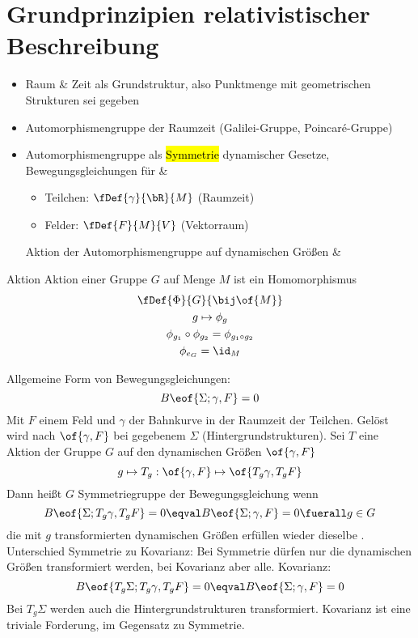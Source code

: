 \section{Grundprinzipien relativistischer Beschreibung}

\begin{itemize}
	\item Raum \& Zeit als Grundstruktur, also Punktmenge mit geometrischen Strukturen sei gegeben
	\item Automorphismengruppe der Raumzeit (\exmpl Galilei-Gruppe, Poincaré-Gruppe)
	\item Automorphismengruppe als \hl{Symmetrie} dynamischer Gesetze, Bewegungsgleichungen für  \&  
	\begin{itemize}
		\item Teilchen: \abb $\fDef{\gamma}{\bR}{M}$ (Raumzeit)
		\item Felder: \abb $\fDef{F}{M}{V}$ (Vektorraum)
	\end{itemize}
	Aktion der Automorphismengruppe  auf dynamischen Größen  \& 
\end{itemize}
\begin{definition}{Aktion}
	Aktion einer Gruppe $G$ auf Menge $M$ ist ein Homomorphismus 
	\begin{gather}
		\fDef{\Phi}{G}{\bij\of{M}} \\
		g \mapsto \phi_g \\
		\phi_{g_1} \circ \phi_{g_2} = \phi_{g_1 \circ g_2} \\
		\phi_{e_G} = \id_M
	\end{gather}
\end{definition}
Allgemeine Form von Bewegungsgleichungen:
\begin{equation}
	B\eof{\Sigma;\gamma,F} = 0
\end{equation}
Mit $F$ einem Feld und $\gamma$ der Bahnkurve in der Raumzeit der Teilchen. Gelöst wird nach $\of{\gamma,F}$ bei gegebenem $\Sigma$ (Hintergrundstrukturen). Sei $T$ eine Aktion der Gruppe $G$ auf den dynamischen Größen $\of{\gamma,F}$
\begin{equation}
	g \mapsto T_g : \of{\gamma,F} \mapsto \of{T_g \gamma, T_g F}
\end{equation}
Dann heißt $G$ Symmetriegruppe der Bewegungsgleichung \kla{\bwg} wenn
\begin{equation}
	B\eof{\Sigma;T_g \gamma, T_g F} = 0 \eqval B\eof{\Sigma; \gamma, F} = 0 \fuerall g \in G
\end{equation}
\dah die mit $g$ transformierten dynamischen Größen erfüllen wieder dieselbe \bwg.
\\
Unterschied Symmetrie zu Kovarianz: Bei Symmetrie dürfen nur die dynamischen Größen transformiert werden, bei Kovarianz aber alle. 
Kovarianz: 
\begin{equation}
	B\eof{T_g \Sigma; T_g \gamma, T_g F} = 0 \eqval B\eof{\Sigma; \gamma, F} = 0
\end{equation}
Bei $T_g \Sigma$ werden auch die Hintergrundstrukturen transformiert. Kovarianz ist eine  triviale  Forderung, im Gegensatz zu Symmetrie.

